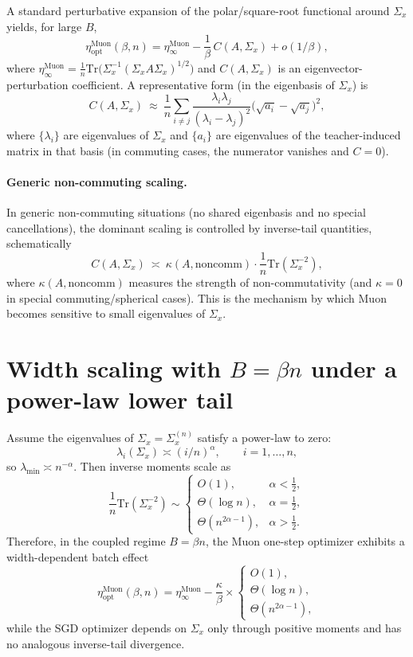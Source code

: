 \documentclass[11pt]{article}
\begin{document}
A standard perturbative expansion of the polar/square-root functional around $\Sigma_x$ yields, for large $B$,
\[
\eta_{\mathrm{opt}}^{\mathrm{Muon}}(\beta,n)
=
\eta_\infty^{\mathrm{Muon}} - \frac{1}{\beta}\,C(A,\Sigma_x) + o(1/\beta),
\]
where $\eta_\infty^{\mathrm{Muon}}=\tfrac{1}{n}\mathrm{Tr}\big(\Sigma_x^{-1}(\Sigma_x A \Sigma_x)^{1/2}\big)$ and
$C(A,\Sigma_x)$ is an eigenvector-perturbation coefficient.
A representative form (in the eigenbasis of $\Sigma_x$) is
\[
C(A,\Sigma_x)\ \approx\ \frac{1}{n}\sum_{i\ne j}\frac{\lambda_i\lambda_j}{(\lambda_i-\lambda_j)^2}\big(\sqrt{a_i}-\sqrt{a_j}\big)^2,
\]
where $\{\lambda_i\}$ are eigenvalues of $\Sigma_x$ and $\{a_i\}$ are eigenvalues of the teacher-induced matrix in that basis
(in commuting cases, the numerator vanishes and $C=0$).

\paragraph{Generic non-commuting scaling.}
In generic non-commuting situations (no shared eigenbasis and no special cancellations), the dominant scaling is controlled by inverse-tail quantities,
schematically
\[
C(A,\Sigma_x)\ \asymp\ \kappa(A,\text{noncomm})\cdot \frac{1}{n}\mathrm{Tr}(\Sigma_x^{-2}),
\]
where $\kappa(A,\text{noncomm})$ measures the strength of non-commutativity (and $\kappa=0$ in special commuting/spherical cases).
This is the mechanism by which Muon becomes sensitive to small eigenvalues of $\Sigma_x$.

\section{Width scaling with $B=\beta n$ under a power-law lower tail}

Assume the eigenvalues of $\Sigma_x=\Sigma_x^{(n)}$ satisfy a power-law to zero:
\[
\lambda_i(\Sigma_x)\asymp (i/n)^\alpha,\qquad i=1,\dots,n,
\]
so $\lambda_{\min}\asymp n^{-\alpha}$.
Then inverse moments scale as
\[
\frac{1}{n}\mathrm{Tr}(\Sigma_x^{-2})
\sim
\begin{cases}
O(1), & \alpha<\tfrac12,\\[4pt]
\Theta(\log n), & \alpha=\tfrac12,\\[4pt]
\Theta(n^{2\alpha-1}), & \alpha>\tfrac12.
\end{cases}
\]
Therefore, in the coupled regime $B=\beta n$, the Muon one-step optimizer exhibits a width-dependent batch effect
\[
\eta_{\mathrm{opt}}^{\mathrm{Muon}}(\beta,n)
=
\eta_\infty^{\mathrm{Muon}}
-
\frac{\kappa}{\beta}\times
\begin{cases}
O(1),\\
\Theta(\log n),\\
\Theta(n^{2\alpha-1}),
\end{cases}
\]
while the SGD optimizer depends on $\Sigma_x$ only through positive moments and has no analogous inverse-tail divergence.
\end{document}
